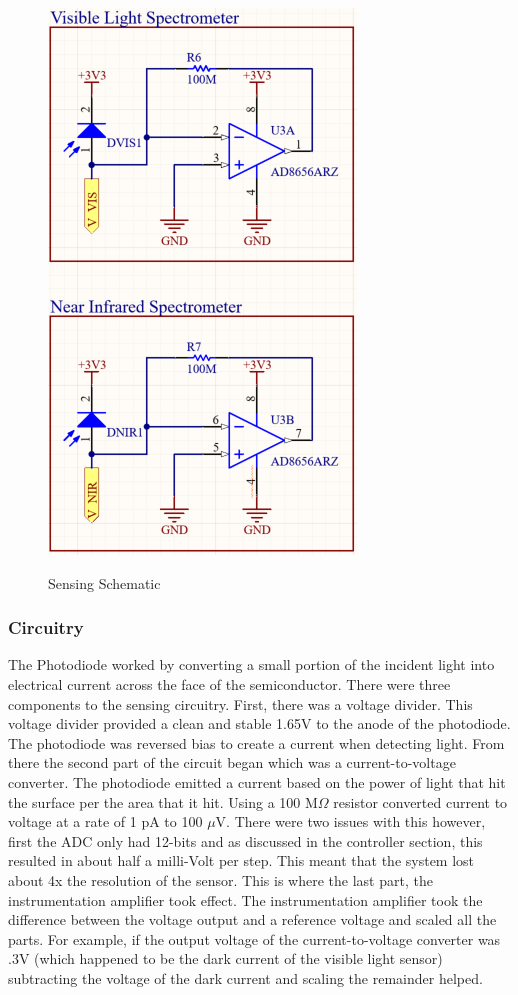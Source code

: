 \begin{figure}[H]
    \caption{Sensing Schematic}
    \centering
    \includegraphics[scale=1.5]{images/SensorSchematics.PNG}
    \label{fig:sensor-schem}
\end{figure}

\subsubsection{Circuitry} The Photodiode worked by converting a small portion of the incident light into electrical current across the face of the semiconductor. There were three components to the sensing circuitry. First, there was a voltage divider. This voltage divider provided a clean and stable 1.65V to the anode of the photodiode. The photodiode was reversed bias to create a current when detecting light. From there the second part of the circuit began which was a current-to-voltage converter. The photodiode emitted a current based on the power of light that hit the surface per the area that it hit. Using a 100 M$\Omega$ resistor converted current to voltage at a rate of 1 pA to 100 $\mu$V. There were two issues with this however, first the ADC only had 12-bits and as discussed in the controller section, this resulted in about half a milli-Volt per step. This meant that the system lost about 4x the resolution of the sensor. This is where the last part, the instrumentation amplifier took effect. The instrumentation amplifier took the difference between the voltage output and a reference voltage and scaled all the parts. For example, if the output voltage of the current-to-voltage converter was .3V (which happened to be the dark current of the visible light sensor) subtracting the voltage of the dark current and scaling the remainder helped.

